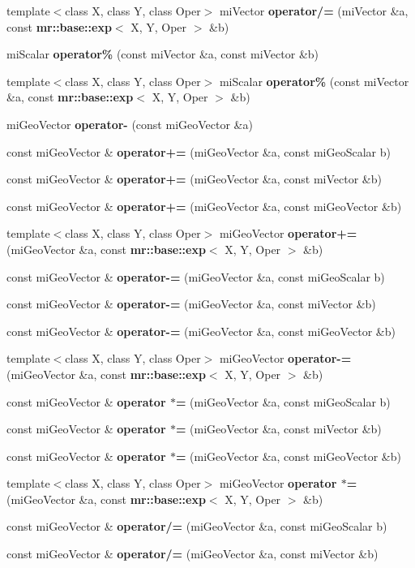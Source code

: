\begin{CompactItemize}
template$<$class X, class Y, class Oper$>$ mi\-Vector {\bf operator/=} (mi\-Vector \&a, const {\bf mr::base::exp}$<$ X, Y, Oper $>$ \&b)
\item 
mi\-Scalar {\bf operator\%} (const mi\-Vector \&a, const mi\-Vector \&b)
\item 
template$<$class X, class Y, class Oper$>$ mi\-Scalar {\bf operator\%} (const mi\-Vector \&a, const {\bf mr::base::exp}$<$ X, Y, Oper $>$ \&b)
\item 
mi\-Geo\-Vector {\bf operator-} (const mi\-Geo\-Vector \&a)
\item 
const mi\-Geo\-Vector \& {\bf operator+=} (mi\-Geo\-Vector \&a, const mi\-Geo\-Scalar b)
\item 
const mi\-Geo\-Vector \& {\bf operator+=} (mi\-Geo\-Vector \&a, const mi\-Vector \&b)
\item 
const mi\-Geo\-Vector \& {\bf operator+=} (mi\-Geo\-Vector \&a, const mi\-Geo\-Vector \&b)
\item 
template$<$class X, class Y, class Oper$>$ mi\-Geo\-Vector {\bf operator+=} (mi\-Geo\-Vector \&a, const {\bf mr::base::exp}$<$ X, Y, Oper $>$ \&b)
\item 
const mi\-Geo\-Vector \& {\bf operator-=} (mi\-Geo\-Vector \&a, const mi\-Geo\-Scalar b)
\item 
const mi\-Geo\-Vector \& {\bf operator-=} (mi\-Geo\-Vector \&a, const mi\-Vector \&b)
\item 
const mi\-Geo\-Vector \& {\bf operator-=} (mi\-Geo\-Vector \&a, const mi\-Geo\-Vector \&b)
\item 
template$<$class X, class Y, class Oper$>$ mi\-Geo\-Vector {\bf operator-=} (mi\-Geo\-Vector \&a, const {\bf mr::base::exp}$<$ X, Y, Oper $>$ \&b)
\item 
const mi\-Geo\-Vector \& {\bf operator $\ast$=} (mi\-Geo\-Vector \&a, const mi\-Geo\-Scalar b)
\item 
const mi\-Geo\-Vector \& {\bf operator $\ast$=} (mi\-Geo\-Vector \&a, const mi\-Vector \&b)
\item 
const mi\-Geo\-Vector \& {\bf operator $\ast$=} (mi\-Geo\-Vector \&a, const mi\-Geo\-Vector \&b)
\item 
template$<$class X, class Y, class Oper$>$ mi\-Geo\-Vector {\bf operator $\ast$=} (mi\-Geo\-Vector \&a, const {\bf mr::base::exp}$<$ X, Y, Oper $>$ \&b)
\item 
const mi\-Geo\-Vector \& {\bf operator/=} (mi\-Geo\-Vector \&a, const mi\-Geo\-Scalar b)
\item 
const mi\-Geo\-Vector \& {\bf operator/=} (mi\-Geo\-Vector \&a, const mi\-Vector \&b)

\end{CompactItemize}
